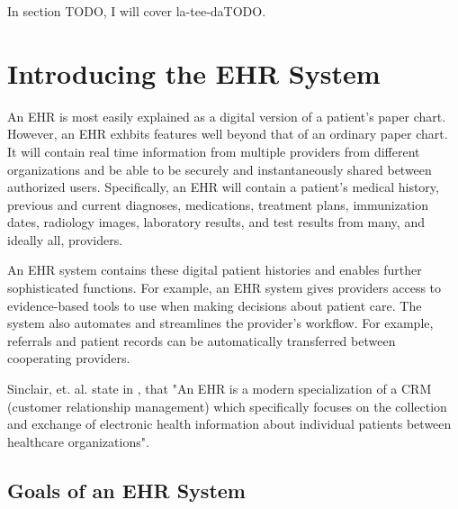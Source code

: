 \documentclass[10pt]{article}
\begin{document}
In section TODO, I will cover la-tee-daTODO.

\section{Introducing the EHR System}
\label{sec:Intro_EHR}

An EHR is most easily explained as a digital version of a patient's paper chart.
However, an EHR exhbits features well beyond that of an ordinary paper chart.
It will contain real time information from multiple providers from different organizations and be able to be securely and instantaneously shared between authorized users.
Specifically, an EHR will contain a patient's medical history, previous and current diagnoses, medications, treatment plans, immunization dates, radiology images, laboratory results, and test results from many, and ideally all, providers.

An EHR system contains these digital patient histories and enables further sophisticated functions.
For example, an EHR system gives providers access to evidence-based tools to use when making decisions about patient care.
The system also automates and streamlines the provider's workflow. For example, referrals and patient records can be automatically transferred between cooperating providers.
\cite{healthit-ehr}

Sinclair, et. al. state in \cite{auditingprivacy}, that "An EHR is a modern specialization of a CRM (customer relationship management) which specifically focuses on the collection and exchange of electronic health information about individual patients between healthcare organizations".


\subsection{Goals of an EHR System}
\label{sec:Goals of an EHR}
\end{document}
